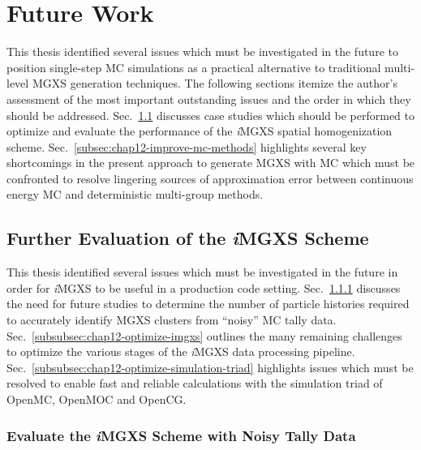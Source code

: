 \section{Future Work}
\label{sec:chap12-future-work}

This thesis identified several issues which must be investigated in the future to position single-step \ac{MC} simulations as a practical alternative to traditional multi-level \ac{MGXS} generation techniques. The following sections itemize the author's assessment of the most important outstanding issues and the order in which they should be addressed. Sec.~\ref{subsec:chap12-further-imgxs} discusses case studies which should be performed to optimize and evaluate the performance of the \textit{i}\ac{MGXS} spatial homogenization scheme. Sec.~\ref{subsec:chap12-improve-mc-methods} highlights several key shortcomings in the present approach to generate \ac{MGXS} with \ac{MC} which must be confronted to resolve lingering sources of approximation error between continuous energy \ac{MC} and deterministic multi-group methods.

\subsection{Further Evaluation of the \textit{i}MGXS Scheme}
\label{subsec:chap12-further-imgxs}

This thesis identified several issues which must be investigated in the future in order for \textit{i}\ac{MGXS} to be useful in a production code setting. Sec.~\ref{subsubsec:chap12-imgxs-noisy-mc-data} discusses the need for future studies to determine the number of particle histories required to accurately identify \ac{MGXS} clusters from ``noisy'' \ac{MC} tally data. Sec.~\ref{subsubsec:chap12-optimize-imgxs} outlines the many remaining challenges to optimize the various stages of the \textit{i}\ac{MGXS} data processing pipeline. Sec.~\ref{subsubsec:chap12-optimize-simulation-triad} highlights issues which must be resolved to enable fast and reliable calculations with the simulation triad of OpenMC, OpenMOC and OpenCG.

\subsubsection{Evaluate the \textit{i}MGXS Scheme with Noisy Tally Data}
\label{subsubsec:chap12-imgxs-noisy-mc-data}

